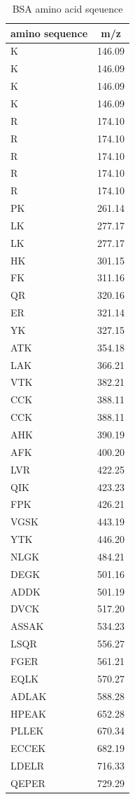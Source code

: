 \documentclass[%
 reprint,
 amsmath,amssymb,
 aps,
]{revtex4-2}
\begin{document}
\begin{longtable}{l|c}
\caption{\label{tab:BSA} BSA amino acid sqeuence}\\
\hline \hline
amino sequence & m/z \\ \hline
\endhead
K & 146.09\\
K & 146.09\\
K & 146.09\\
K & 146.09\\
R & 174.10\\
R & 174.10\\
R & 174.10\\
R & 174.10\\
R & 174.10\\
PK & 261.14\\
LK & 277.17\\
LK & 277.17\\
HK & 301.15\\
FK & 311.16\\
QR & 320.16\\
ER & 321.14\\
YK & 327.15\\
ATK & 354.18\\
LAK & 366.21\\
VTK & 382.21\\
CCK & 388.11\\
CCK & 388.11\\
AHK & 390.19\\
AFK & 400.20\\
LVR & 422.25\\
QIK & 423.23\\
FPK & 426.21\\
VGSK & 443.19\\
YTK & 446.20\\
NLGK & 484.21\\
DEGK & 501.16\\
ADDK & 501.19\\
DVCK & 517.20\\
ASSAK & 534.23\\
LSQR & 556.27\\
FGER & 561.21\\
EQLK & 570.27\\
ADLAK & 588.28\\
HPEAK & 652.28\\
PLLEK & 670.34\\
ECCEK & 682.19\\
LDELR & 716.33\\
QEPER & 729.29\\

\end{longtable}
\end{document}
